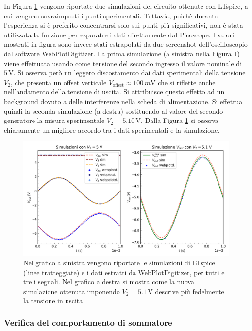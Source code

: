 \documentclass[a4paper,11pt]{article}
\newcommand\V{ \,\si{\volt} }
\begin{document}
In Figura \ref{fig:sum_sim} vengono riportate due simulazioni del circuito ottenute con
LTspice, a cui vengono
sovraimposti i punti sperimentali. Tuttavia, poichè durante l'esperienza
si è preferito concentrarsi solo sui punti più significativi, non è stata
utilizzata la funzione per esporatre i dati direttamente dal Picoscope.
I valori mostrati in figura sono invece stati estrapolati da due screenshot
dell'oscilloscopio dal software WebPlotDigitizer. La prima simulazione (a sinistra
nella Figura \ref{fig:sum_sim}) viene effettuata usando come tensione del secondo ingresso il valore
nominale di $5 \V$. Si osserva però un leggero discostamento dai dati sperimentali
della tensione $V_{2}$, che presenta un offset verticale
$V_{\text{offset}}\approx 100\,\si{m\volt}$
che si riflette anche nell'andamento della tensione di uscita.
Si attribuisce questo effetto ad un background dovuto a delle interferenze
nella scheda di alimentazione. Si effettua quindi la seconda simulazione
(a destra) sostituendo al valore del secondo generatore la misura sperimentale
$V_{2}=5.10 \V$. Dalla Figura \ref{fig:sum_sim} si osserva chiaramente un migliore accordo
tra i dati sperimentali e la simulazione.
\begin{figure}[h]
\centering
\includegraphics[width=1.0\textwidth]{images/sum_simulation}
\caption{\footnotesize Nel grafico a sinistra vengono riportate le simulazioni di LTspice (linee tratteggiate) e i dati estratti da WebPlotDigitizer, per tutti e tre i segnali. Nel
grafico a destra si mostra come la nuova simulazione ottenuta imponendo $V_{2}=5.1 \V$ descrive più fedelmente la tensione in uscita}\label{fig:sum_sim}
\end{figure}

\subsubsection{Verifica del comportamento di sommatore}
\end{document}
